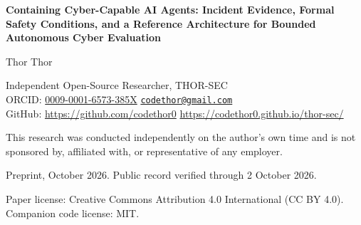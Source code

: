 \documentclass[11pt,letterpaper]{article}
\newcommand{\authorname}{Thor Thor}
\newcommand{\orcidid}{0009-0001-6573-385X}
\begin{document}
\begin{center}
{\LARGE\bfseries Containing Cyber-Capable AI Agents: Incident Evidence, Formal Safety Conditions, and a Reference Architecture for Bounded Autonomous Cyber Evaluation\par}
\vspace{1.0em}
{\large \authorname\par}
\vspace{0.3em}
{\small Independent Open-Source Researcher, THOR-SEC\\
ORCID: \href{https://orcid.org/\orcidid}{\orcidid} \quad \href{mailto:codethor@gmail.com}{\texttt{codethor@gmail.com}}\\
GitHub: \url{https://github.com/codethor0} \quad \url{https://codethor0.github.io/thor-sec/}\par}
\vspace{0.3em}
{\small This research was conducted independently on the author's own time and is not sponsored by, affiliated with, or representative of any employer.\par}
\vspace{0.3em}
{\small Preprint, October 2026. Public record verified through 2 October 2026.\par}
\vspace{0.2em}
{\small Paper license: Creative Commons Attribution 4.0 International (CC BY 4.0). Companion code license: MIT.\par}
\end{center}
\end{document}

